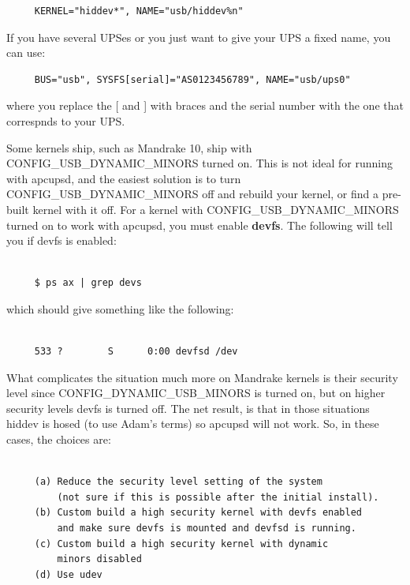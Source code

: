 \footnotesize
\begin{verbatim}
     KERNEL="hiddev*", NAME="usb/hiddev%n"
\end{verbatim}
\normalsize

If you have several UPSes or you just want to give your UPS a fixed name, you
can use: 

\footnotesize
\begin{verbatim}
     BUS="usb", SYSFS[serial]="AS0123456789", NAME="usb/ups0"
\end{verbatim}
\normalsize

where you replace the [ and ] with braces and the serial number with the one
that correspnds to your UPS.  

Some kernels ship, such as Mandrake 10, ship with CONFIG\_USB\_DYNAMIC\_MINORS
turned on. This is not ideal for running with apcupsd, and the easiest
solution is to turn CONFIG\_USB\_DYNAMIC\_MINORS off and rebuild your kernel,
or find a pre-built kernel with it off. For a kernel with
CONFIG\_USB\_DYNAMIC\_MINORS turned on to work with apcupsd, you must enable
{\bf devfs}. The following will tell you if devfs is enabled: 

\footnotesize
\begin{verbatim}
     
     $ ps ax | grep devs
\end{verbatim}
\normalsize

which should give something like the following: 

\footnotesize
\begin{verbatim}
     
     533 ?        S      0:00 devfsd /dev
\end{verbatim}
\normalsize

What complicates the situation much more on Mandrake kernels is their security
level since CONFIG\_DYNAMIC\_USB\_MINORS is turned on, but on higher security
levels devfs is turned off. The net result, is that in those situations hiddev
is hosed (to use Adam's terms) so apcupsd will not work. So, in these cases,
the choices are: 

\footnotesize
\begin{verbatim}
     
     (a) Reduce the security level setting of the system
         (not sure if this is possible after the initial install).
     (b) Custom build a high security kernel with devfs enabled
         and make sure devfs is mounted and devfsd is running.
     (c) Custom build a high security kernel with dynamic
         minors disabled
     (d) Use udev
\end{verbatim}
\normalsize

